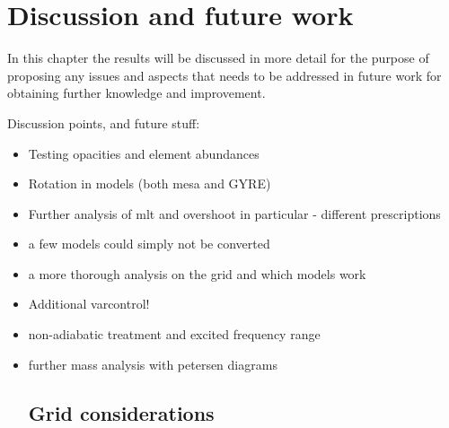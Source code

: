 \chapter{Discussion and future work}
\label{sec:discussion}

In this chapter the results will be discussed in more detail for the purpose of proposing any issues and aspects that needs to be addressed in future work for obtaining further knowledge and improvement. 

Discussion points, and future stuff:

\begin{itemize}
    \item Testing opacities and element abundances
    \item Rotation in models (both mesa and GYRE)
    \item Further analysis of mlt and overshoot in particular - different prescriptions
    \item a few models could simply not be converted
    \item a more thorough analysis on the grid and which models work
    \item Additional varcontrol!
    \item non-adiabatic treatment and excited frequency range
    \item further mass analysis with petersen diagrams

\section{Grid considerations}


\end{itemize}
